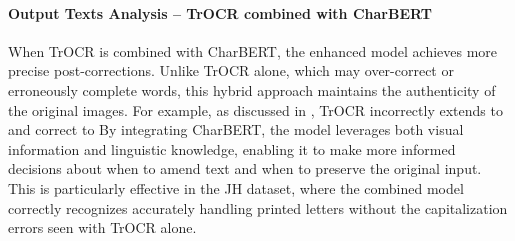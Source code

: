 
\paragraph*{Output Texts Analysis -- TrOCR combined with CharBERT}
When TrOCR is combined with CharBERT, the enhanced model achieves more precise post-corrections. Unlike TrOCR alone, which may over-correct or erroneously complete words, this hybrid approach maintains the authenticity of the original images. For example, as discussed in , TrOCR incorrectly extends  to  and correct  to  By integrating CharBERT, the model leverages both visual information and linguistic knowledge, enabling it to make more informed decisions about when to amend text and when to preserve the original input. This is particularly effective in the JH dataset, where the combined model correctly recognizes  accurately handling printed letters without the capitalization errors seen with TrOCR alone.

